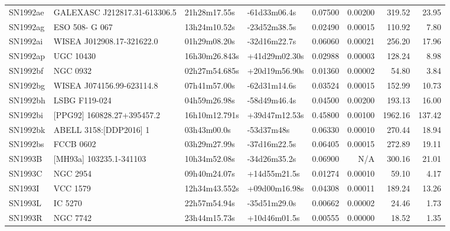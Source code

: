 \begin{longtable}{llllrrrr}
SN1992ae         &  GALEXASC J212817.31-613306.5   &    21h28m17.55s &    -61d33m06.4s &  0.07500 &  0.00200 &   319.52 &       23.95 \\
SN1992ag         &                  ESO 508- G 067 &    13h24m10.52s &    -23d52m38.5s &  0.02490 &  0.00015 &   110.92 &        7.80 \\
SN1992ai         &       WISEA J012908.17-321622.0 &    01h29m08.20s &    -32d16m22.7s &  0.06060 &  0.00021 &   256.20 &       17.96 \\
SN1992ap         &                       UGC 10430 &   16h30m26.843s &   +41d29m02.30s &  0.02988 &  0.00003 &   128.24 &        8.98 \\
SN1992bf         &                        NGC 0932 &   02h27m54.685s &   +20d19m56.90s &  0.01360 &  0.00002 &    54.80 &        3.84 \\
SN1992bg         &       WISEA J074156.99-623114.8 &    07h41m57.00s &    -62d31m14.6s &  0.03524 &  0.00015 &   152.99 &       10.73 \\
SN1992bh         &                   LSBG F119-024 &    04h59m26.98s &    -58d49m46.4s &  0.04500 &  0.00200 &   193.13 &       16.00 \\
SN1992bi         &      [PPG92] 160828.27+395457.2 &   16h10m12.791s &   +39d47m12.53s &  0.45800 &  0.00100 &  1962.16 &      137.42 \\
SN1992bk         &          ABELL 3158:[DDP2016] 1 &     03h43m00.0s &      -53d37m48s &  0.06330 &  0.00010 &   270.44 &       18.94 \\
SN1992bs         &                       FCCB 0602 &    03h29m27.99s &    -37d16m22.5s &  0.06405 &  0.00015 &   272.89 &       19.11 \\
SN1993B          &         [MH93a] 103235.1-341103 &    10h34m52.08s &    -34d26m35.2s &  0.06900 &      N/A &   300.16 &       21.01 \\
SN1993C          &                        NGC 2954 &    09h40m24.07s &    +14d55m21.5s &  0.01274 &  0.00010 &    59.10 &        4.17 \\
SN1993I          &                        VCC 1579 &   12h34m43.552s &   +09d00m16.98s &  0.04308 &  0.00011 &   189.24 &       13.26 \\
SN1993L          &                         IC 5270 &    22h57m54.94s &    -35d51m29.0s &  0.00662 &  0.00002 &    24.46 &        1.73 \\
SN1993R          &                        NGC 7742 &    23h44m15.73s &    +10d46m01.5s &  0.00555 &  0.00000 &    18.52 &        1.35 \\

\end{longtable}
